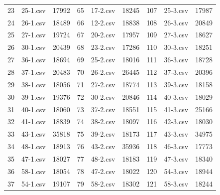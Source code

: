 \begin{longtable}{|c|c|c|c|c|c|c|c|c|}
  23          & 25-1.csv       & 17992         & 65          & 17-2.csv       & 18245         & 107         & 25-3.csv       & 17987         \\
  24          & 26-1.csv       & 18489         & 66          & 12-2.csv       & 18838         & 108         & 26-3.csv       & 20849         \\
  25          & 27-1.csv       & 19724         & 67          & 20-2.csv       & 17957         & 109         & 27-3.csv       & 18627         \\
  26          & 30-1.csv       & 20439         & 68          & 23-2.csv       & 17286         & 110         & 30-3.csv       & 18251         \\
  27          & 36-1.csv       & 18694         & 69          & 25-2.csv       & 18016         & 111         & 36-3.csv       & 18728         \\
  28          & 37-1.csv       & 20483         & 70          & 26-2.csv       & 26445         & 112         & 37-3.csv       & 20396         \\
  29          & 38-1.csv       & 18056         & 71          & 27-2.csv       & 18774         & 113         & 39-3.csv       & 18158         \\
  30          & 39-1.csv       & 19376         & 72          & 30-2.csv       & 20846         & 114         & 40-3.csv       & 18029         \\
  31          & 40-1.csv       & 18060         & 73          & 37-2.csv       & 18551         & 115         & 41-3.csv       & 25166         \\
  32          & 41-1.csv       & 18839         & 74          & 38-2.csv       & 18097         & 116         & 42-3.csv       & 18030         \\
  33          & 43-1.csv       & 35818         & 75          & 39-2.csv       & 18173         & 117         & 43-3.csv       & 34975         \\
  34          & 48-1.csv       & 18913         & 76          & 43-2.csv       & 35936         & 118         & 46-3.csv       & 17773         \\
  35          & 47-1.csv       & 18027         & 77          & 48-2.csv       & 18183         & 119         & 47-3.csv       & 18340         \\
  36          & 58-1.csv       & 18054         & 78          & 47-2.csv       & 18022         & 120         & 54-3.csv       & 18944         \\
  37          & 54-1.csv       & 19107         & 79          & 58-2.csv       & 18302         & 121         & 58-3.csv       & 18244         \\

\end{longtable}
